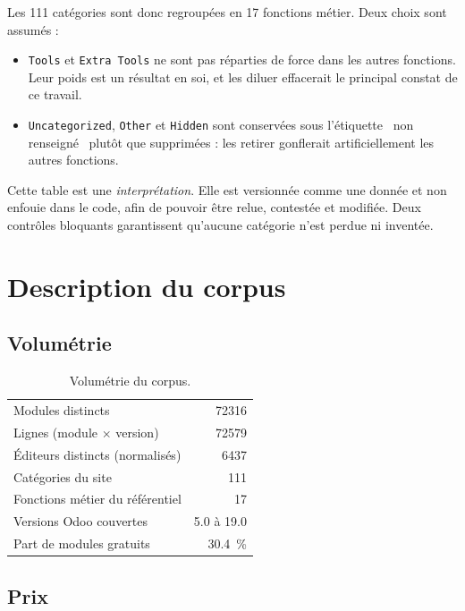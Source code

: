 \documentclass[11pt,a4paper]{article}
\begin{document}
Les \num{111} catégories sont donc regroupées en \num{17} fonctions métier. Deux
choix sont assumés :

\begin{itemize}
  \item \texttt{Tools} et \texttt{Extra Tools} ne sont pas réparties de force
  dans les autres fonctions. Leur poids est un résultat en soi, et les diluer
  effacerait le principal constat de ce travail.
  \item \texttt{Uncategorized}, \texttt{Other} et \texttt{Hidden} sont
  conservées sous l'étiquette \guillemotleft~non renseigné~\guillemotright{}
  plutôt que supprimées : les retirer gonflerait artificiellement les autres
  fonctions.
\end{itemize}

Cette table est une \emph{interprétation}. Elle est versionnée comme une donnée
et non enfouie dans le code, afin de pouvoir être relue, contestée et modifiée.
Deux contrôles bloquants garantissent qu'aucune catégorie n'est perdue ni
inventée.

\section{Description du corpus}

\subsection{Volumétrie}

\begin{table}[htbp]
\centering
\caption{Volumétrie du corpus.}
\label{tab:volumetrie}
\begin{tabular}{lr}
\toprule
Modules distincts                      & \num{72316} \\
Lignes (module $\times$ version)       & \num{72579} \\
Éditeurs distincts (normalisés)        & \num{6437} \\
Catégories du site                     & \num{111} \\
Fonctions métier du référentiel        & \num{17} \\
Versions Odoo couvertes                & 5.0 à 19.0 \\
Part de modules gratuits               & \SI{30.4}{\percent} \\
\bottomrule
\end{tabular}
\end{table}

\subsection{Prix}
\end{document}
